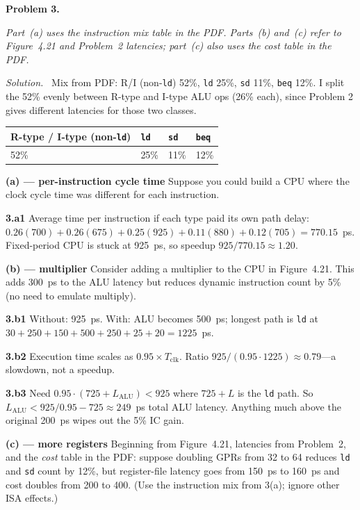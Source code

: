 \documentclass[12pt]{article}
\newcommand{\problem}[1]{\vspace{0.8em}\noindent\textbf{Problem #1.}\vspace{0.35em}}
\newenvironment{solution}{\par\noindent\textit{Solution.}\ }{\par\vspace{1.1em}}
\newcommand{\subproblem}[1]{\par\vspace{0.45em}\noindent\textbf{#1}\quad}
\newcommand{\assigntext}[1]{\par\vspace{0.25em}\small\textit{#1}\par\vspace{0.35em}}
\begin{document}
\problem{3}
\assigntext{Part~(a) uses the instruction mix table in the PDF. Parts~(b) and~(c) refer to Figure~4.21 and Problem~2 latencies; part~(c) also uses the cost table in the PDF.}

\begin{solution}
Mix from PDF: R/I (non-\texttt{ld}) 52\%, \texttt{ld} 25\%, \texttt{sd} 11\%, \texttt{beq} 12\%. I split the 52\% evenly between R-type and I-type ALU ops (26\% each), since Problem 2 gives different latencies for those two classes.

\begin{center}
\begin{tabular}{@{}llll@{}}
\toprule
R-type / I-type (non-\texttt{ld}) & \texttt{ld} & \texttt{sd} & \texttt{beq} \\
\midrule
52\% & 25\% & 11\% & 12\% \\
\bottomrule
\end{tabular}
\end{center}

\subproblem{(a) --- per-instruction cycle time}
Suppose you could build a CPU where the clock cycle time was different for each instruction.

\subproblem{3.a1}
Average time per instruction if each type paid its own path delay:
$0.26(700)+0.26(675)+0.25(925)+0.11(880)+0.12(705)=770.15$~ps.
Fixed-period CPU is stuck at 925~ps, so speedup $925/770.15 \approx \mathbf{1.20}$.

\subproblem{(b) --- multiplier}
Consider adding a multiplier to the CPU in Figure~4.21. This adds 300~ps to the ALU latency but reduces dynamic instruction count by 5\% (no need to emulate multiply).

\subproblem{3.b1}
Without: 925~ps. With: ALU becomes 500~ps; longest path is \texttt{ld} at $30+250+150+500+250+25+20=1225$~ps.

\subproblem{3.b2}
Execution time scales as $0.95\times T_{\mathrm{clk}}$. Ratio $925/(0.95\cdot1225)\approx \mathbf{0.79}$---a slowdown, not a speedup.

\subproblem{3.b3}
Need $0.95\cdot(725+L_{\mathrm{ALU}})<925$ where $725+L$ is the \texttt{ld} path. So $L_{\mathrm{ALU}}<925/0.95-725\approx 249$~ps total ALU latency. Anything much above the original 200~ps wipes out the 5\% IC gain.

\subproblem{(c) --- more registers}
Beginning from Figure~4.21, latencies from Problem~2, and the \emph{cost} table in the PDF: suppose doubling GPRs from 32 to 64 reduces \texttt{ld} and \texttt{sd} count by 12\%, but register-file latency goes from 150~ps to 160~ps and cost doubles from 200 to 400. (Use the instruction mix from 3(a); ignore other ISA effects.)


\end{solution}
\end{document}
